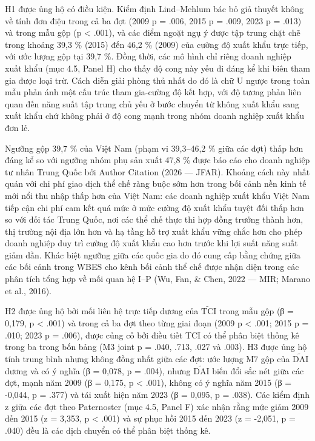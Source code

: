 \documentclass[12pt,a4paper]{article}
\begin{document}
H1 được ủng hộ có điều kiện. Kiểm định Lind--Mehlum bác bỏ giả thuyết
không về tính đơn điệu trong cả ba đợt (2009 p = .006, 2015 p = .009,
2023 p = .013) và trong mẫu gộp (p \textless{} .001), và các điểm ngoặt
ngụ ý được tập trung chặt chẽ trong khoảng 39,3 \% (2015) đến 46,2 \%
(2009) của cường độ xuất khẩu trực tiếp, với ước lượng gộp tại 39,7 \%.
Đồng thời, các mô hình chỉ riêng doanh nghiệp xuất khẩu (mục 4.5, Panel
H) cho thấy độ cong này yếu đi đáng kể khi biên tham gia được loại trừ.
Cách diễn giải phòng thủ nhất do đó là chữ U ngược trong toàn mẫu phản
ánh một cấu trúc tham gia-cường độ kết hợp, với độ tương phản liên quan
đến năng suất tập trung chủ yếu ở bước chuyển từ không xuất khẩu sang
xuất khẩu chứ không phải ở độ cong mạnh trong nhóm doanh nghiệp xuất
khẩu đơn lẻ.

Ngưỡng gộp 39,7 \% của Việt Nam (phạm vi 39,3--46,2 \% giữa các đợt)
thấp hơn đáng kể so với ngưỡng nhóm phụ sản xuất 47,8 \% được báo cáo
cho doanh nghiệp tư nhân Trung Quốc bởi Author Citation (2026 --- JFAR).
Khoảng cách này nhất quán với chi phí giao dịch thể chế ràng buộc sớm
hơn trong bối cảnh nền kinh tế mới nổi thu nhập thấp hơn của Việt Nam:
các doanh nghiệp xuất khẩu Việt Nam tiếp cận chi phí cam kết quá mức ở
mức cường độ xuất khẩu tuyệt đối thấp hơn so với đối tác Trung Quốc, nơi
các thể chế thực thi hợp đồng trưởng thành hơn, thị trường nội địa lớn
hơn và hạ tầng hỗ trợ xuất khẩu vững chắc hơn cho phép doanh nghiệp duy
trì cường độ xuất khẩu cao hơn trước khi lợi suất năng suất giảm dần.
Khác biệt ngưỡng giữa các quốc gia do đó cung cấp bằng chứng giữa các
bối cảnh trong WBES cho kênh bối cảnh thể chế được nhận diện trong các
phân tích tổng hợp về mối quan hệ I--P (Wu, Fan, \& Chen, 2022 --- MIR;
Marano et al., 2016).

H2 được ủng hộ bởi mối liên hệ trực tiếp dương của
\(\tilde{\mathrm{TCI}}\) trong mẫu gộp (β = 0,179, p \textless{} .001)
và trong cả ba đợt theo từng giai đoạn (2009 p \textless{} .001; 2015 p
= .010; 2023 p = .006), được củng cố bởi điều tiết TCI có thể phân biệt
thống kê trong ba trong bốn bảng (M3 joint p = .040, .713, .027 và
.003). H3 được ủng hộ tính trung bình nhưng không đồng nhất giữa các
đợt: ước lượng M7 gộp của \(\tilde{\mathrm{DAI}}\) dương và có ý nghĩa
(β = 0,078, p = .004), nhưng \(\tilde{\mathrm{DAI}}\) biến đổi sắc nét
giữa các đợt, mạnh năm 2009 (β = 0,175, p \textless{} .001), không có ý
nghĩa năm 2015 (β = -0,044, p = .377) và tái xuất hiện năm 2023 (β =
0,095, p = .038). Các kiểm định z giữa các đợt theo Paternoster (mục
4.5, Panel F) xác nhận rằng mức giảm 2009 đến 2015 (z = 3,353, p
\textless{} .001) và sự phục hồi 2015 đến 2023 (z = -2,051, p = .040)
đều là các dịch chuyển có thể phân biệt thống kê.
\end{document}
